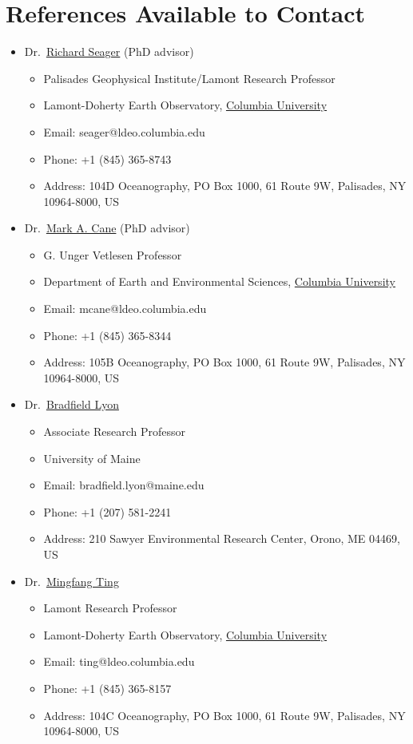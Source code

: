 \documentclass[11pt]{article}
\newcommand{\cu}{\href{http://www.columbia.edu}{Columbia University}}
\newcommand{\richard}{\href{http://www.ldeo.columbia.edu/res/div/ocp/people/seager/}{Richard Seager}}
\newcommand{\cane}{\href{http://www.ldeo.columbia.edu/user/mcane}{Mark A. Cane}}
\newcommand{\mingfang}{\href{http://www.ldeo.columbia.edu/user/ting}{Mingfang Ting}}
\newcommand{\brad}{\href{http://climatechange.umaine.edu/people/profile/bradfield_lyon}
{Bradfield Lyon}}
\begin{document}
\section{References Available to Contact}
\begin{itemize}[leftmargin=4ex, itemsep=1ex]
	\item Dr.~\richard{} (PhD advisor)
	\begin{itemize}
		\item Palisades Geophysical Institute/Lamont Research Professor 
		\item Lamont-Doherty Earth Observatory, \cu{}
    		\item Email: seager@ldeo.columbia.edu
		\item Phone: +1 (845) 365-8743 
    	 	\item Address: 104D Oceanography, PO Box 1000, 61 Route 9W, Palisades, NY 10964-8000, US 
	 	\end{itemize}
	
	\item Dr.~\cane{} (PhD advisor)
	\begin{itemize}
		\item G. Unger Vetlesen Professor
		\item Department of Earth and Environmental Sciences, \cu{}
    		\item Email: mcane@ldeo.columbia.edu
		\item Phone: +1 (845) 365-8344 
    	 	\item Address: 105B Oceanography, PO Box 1000, 61 Route 9W, Palisades, NY 10964-8000, US 
	 	\end{itemize}
	
	\item Dr.~\brad{}  
	\begin{itemize}
		\item Associate Research Professor
		\item University of Maine
    		\item Email: bradfield.lyon@maine.edu
		\item Phone: +1 (207) 581-2241
    	 	\item Address: 210 Sawyer Environmental Research Center, Orono, ME 04469, US 
	 	\end{itemize}
	
	\item Dr.~\mingfang{}
	\begin{itemize}
		\item Lamont Research Professor
		\item Lamont-Doherty Earth Observatory, \cu{}
    		\item Email: ting@ldeo.columbia.edu
		\item Phone: +1 (845) 365-8157 
    	 	\item Address: 104C Oceanography, PO Box 1000, 61 Route 9W, Palisades, NY 10964-8000, US 
	 	\end{itemize}
	

\end{itemize}
\end{document}
